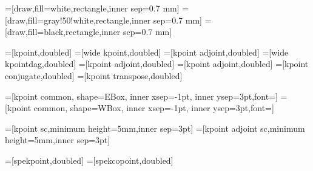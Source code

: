 =[draw,fill=white,rectangle,inner sep=0.7 mm]
=[draw,fill=gray!50!white,rectangle,inner sep=0.7 mm]
=[draw,fill=black,rectangle,inner sep=0.7 mm]

=[kpoint,doubled]
=[wide kpoint,doubled]
=[kpoint adjoint,doubled]
=[wide kpointdag,doubled]
=[kpoint adjoint,doubled]
=[kpoint adjoint,doubled]
=[kpoint conjugate,doubled]
=[kpoint transpose,doubled]

=[kpoint common, shape=EBox, inner xsep=-1pt, inner ysep=3pt,font=\small]
=[kpoint common, shape=WBox, inner xsep=-1pt, inner ysep=3pt,font=\small]

=[kpoint sc,minimum height=5mm,inner sep=3pt]
=[kpoint adjoint sc,minimum height=5mm,inner sep=3pt]

=[spekpoint,doubled]
=[spekcopoint,doubled]